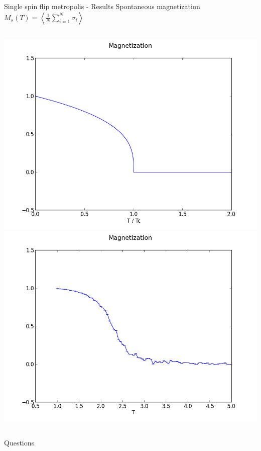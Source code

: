 \documentclass[handout]{beamer}
\begin{document}
\begin{frame}{Single spin flip metropolis - Results}
Spontaneous magnetization \( M_s(T) = \left< \frac{1}{N} \sum\limits_{i=1}^N \sigma_i \right> \)
\begin{columns}[c]
	\includegraphics[width=\textwidth]{img/single_magnetization_theoretical.png}
	\includegraphics[width=\textwidth]{img/single_magnetization_size15.png}
\end{columns}
\end{frame}

\begin{frame}
\centerline{\huge{Questions}}
\end{frame}
\end{document}

